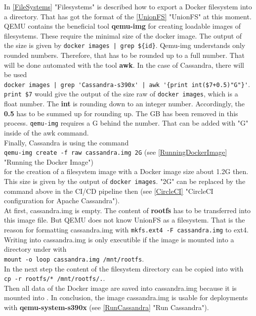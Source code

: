 In \ref{FileSystems} "Filesystems" is described how to export a Docker filesystem into a directory. That has got the format of the \ref{UnionFS} "UnionFS" at this moment. QEMU contains the beneficial tool \textbf{qemu-img} for creating loadable images of filesystems. These require the minimal size of the docker image. The output of the size is given by \lstinline!docker images | grep ${id}!. Qemu-img understands only rounded numbers. Therefore, that has to be rounded up to a full number. That will be done automated with the tool \textbf{awk}. 
In the case of Cassandra, there will be used \\
\lstinline!docker images | grep 'Cassandra-s390x' | awk '{print int($7+0.5)"G"}'!. \\
\lstinline!print $7! would give the output of the size raw of \lstinline!docker images!, which is a float number. The \textbf{int} is rounding down to an integer number. Accordingly, the \textbf{0.5} has to be summed up for rounding up. The GB has been removed in this process. \lstinline!qemu-img! requires a G behind the number. That can be added with "G" inside of the awk command. \\

Finally, Cassandra is using the command \\
\lstinline!qemu-img create -f raw cassandra.img 2G! (see \ref{RunningDockerImage} "Running the Docker Image") \\
for the creation of a filesystem image with a Docker image size about 1.2G then. This size is given by the output of \lstinline!docker images!.  "2G" can be replaced by the command above in the CI/CD pipeline then (see \ref{CircleCI} "CircleCI configuration for Apache Cassandra"). \\
At first, cassandra.img is empty. The content of \textbf{rootfs} has to be transferred into this image file. But QEMU does not know UnionFS as a filesystem. That is the reason for formatting cassandra.img with \lstinline!mkfs.ext4 -F cassandra.img! to ext4. Writing into cassandra.img is only executible if the image is mounted into a directory under  with \\
\lstinline!mount -o loop cassandra.img /mnt/rootfs!. \\ 
In the next step the content of the filesystem directory can be copied into  with \\ 
\lstinline!cp -r rootfs/* /mnt/rootfs/.!. \\ 
Then all data of the Docker image are saved into cassandra.img because it is mounted into . In conclusion, the image cassandra.img is usable for deployments with \textbf{qemu-system-s390x} (see \ref{RunCassandra} "Run Cassandra"). 